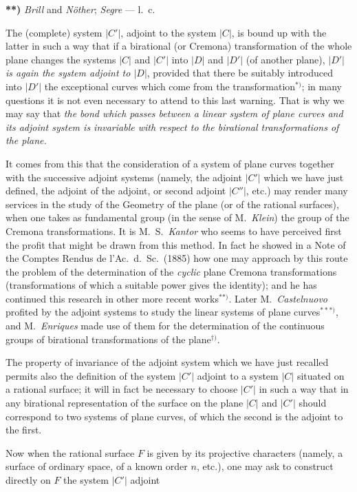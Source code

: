 \documentclass{article}
\begin{document}
\textbf{**)} \emph{Brill} and \emph{Nöther}; \emph{Segre} --- l.\ c.


The (complete) system $|C'|$, adjoint to the system $|C|$, is bound up with the latter in such a way that if a birational (or Cremona) transformation of the whole plane changes the systems $|C|$ and $|C'|$ into $|D|$ and $|D'|$ (of another plane), \emph{$|D'|$ is again the system adjoint to $|D|$}, provided that there be suitably introduced into $|D'|$ the exceptional curves which come from the transformation${}^{*)}$; in many questions it is not even necessary to attend to this last warning. That is why we may say that \emph{the bond which passes between a linear system of plane curves and its adjoint system is invariable with respect to the birational transformations of the plane.}

It comes from this that the consideration of a system of plane curves together with the successive adjoint systems (namely, the adjoint $|C'|$ which we have just defined, the adjoint of the adjoint, or second adjoint $|C''|$, etc.) may render many services in the study of the Geometry of the plane (or of the rational surfaces), when one takes as fundamental group (in the sense of M.\ \emph{Klein}) the group of the Cremona transformations. It is M.\ S.\ \emph{Kantor} who seems to have perceived first the profit that might be drawn from this method. In fact he showed in a Note of the Comptes Rendus de l'Ac.\ d.\ Sc.\ (1885) how one may approach by this route the problem of the determination of the \emph{cyclic} plane Cremona transformations (transformations of which a suitable power gives the identity); and he has continued this research in other more recent works${}^{**)}$. Later M.\ \emph{Castelnuovo} profited by the adjoint systems to study the linear systems of plane curves${}^{***)}$, and M.\ \emph{Enriques} made use of them for the determination of the continuous groups of birational transformations of the plane${}^{\dagger)}$.

The property of invariance of the adjoint system which we have just recalled permits also the definition of the system $|C'|$ adjoint to a system $|C|$ situated on a rational surface; it will in fact be necessary to choose $|C'|$ in such a way that in any birational representation of the surface on the plane $|C|$ and $|C'|$ should correspond to two systems of plane curves, of which the second is the adjoint to the first.

Now when the rational surface $F$ is given by its projective characters (namely, a surface of ordinary space, of a known order $n$, etc.), one may ask to construct directly on $F$ the system $|C'|$ adjoint
\end{document}
